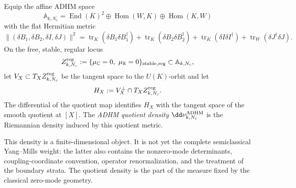 \begin{definition}
\label{def:adhm-quotient-density}
Equip the affine ADHM space
\[
  \mathbb A_{k,N_c}
  =
  \operatorname{End}(K)^2
  \oplus\operatorname{Hom}(W,K)
  \oplus\operatorname{Hom}(K,W)
\]
with the flat Hermitian metric
\[
  \|(\delta B_1,\delta B_2,\delta I,\delta J)\|^2
  =
  \operatorname{tr}_K(\delta B_1\delta B_1^\dagger)
  +\operatorname{tr}_K(\delta B_2\delta B_2^\dagger)
  +\operatorname{tr}_K(\delta I\delta I^\dagger)
  +\operatorname{tr}_W(\delta J^\dagger\delta J).
\]
On the free, stable, regular locus
\[
  Z_{k,N_c}^{\rm reg}
  :=
  \{\mu_{\mathbb C}=0,\ \mu_{\mathbb R}=0\}_{\rm stable,reg}
  \subset \mathbb A_{k,N_c},
\]
let \(V_X\subset T_X Z_{k,N_c}^{\rm reg}\) be the tangent space to the
\(U(K)\)-orbit and let
\[
  H_X:=V_X^\perp\cap T_XZ_{k,N_c}^{\rm reg}.
\]
The differential of the quotient map identifies \(H_X\) with the tangent
space of the smooth quotient at \([X]\).  The \emph{ADHM quotient density}
\(\dd\nu_{k,N_c}^{\rm ADHM}\) is the Riemannian density induced by this
quotient metric.
\end{definition}

This density is a finite-dimensional object.  It is not yet the complete
semiclassical Yang--Mills weight: the latter also contains the nonzero-mode
determinants, coupling-coordinate convention, operator renormalization, and
the treatment of the boundary strata.  The quotient density is the part of
the measure fixed by the classical zero-mode geometry.

